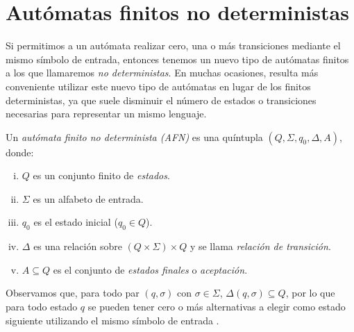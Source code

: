 \section{Autómatas finitos no deterministas}

Si permitimos a un autómata realizar cero, una o más transiciones mediante el mismo símbolo de entrada, entonces
tenemos un nuevo tipo de autómatas finitos a los que llamaremos \textit{no deterministas}. En muchas ocasiones,
resulta más conveniente utilizar este nuevo tipo de autómatas en lugar de los finitos deterministas, ya que suele
disminuir el número de estados o transiciones necesarias para representar un mismo lenguaje.

\begin{definicion}Un \textit{autómata finito no determinista (AFN)} es una quíntupla 
$(Q,\Sigma,q_0,\Delta,A)$, donde:
\begin{enumerate}[(i)]
    \item $Q$ es un conjunto finito de \textit{estados}.
    \item $\Sigma$ es un alfabeto de entrada.
    \item $q_0$ es el estado inicial ($q_0\in Q$).
    \item $\Delta$ es una relación sobre $(Q\times\Sigma)\times Q$ y se llama \textit{relación de transición}.
    \item $A\subseteq Q$ es el conjunto de \textit{estados finales} o \textit{aceptación}.    
\end{enumerate}
Observamos que, para todo par $(q,\sigma)$ con $\sigma\in\Sigma$, $\Delta(q,\sigma)\subseteq Q$, por lo que para todo 
estado $q$ se pueden tener cero o más alternativas a elegir como estado siguiente utilizando el mismo símbolo de 
entrada \cite{kelley_2001}.
\end{definicion}

